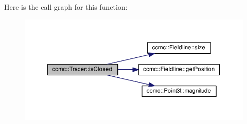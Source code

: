 Here is the call graph for this function\-:
\nopagebreak
\begin{figure}[H]
\begin{center}
\leavevmode
\includegraphics[width=350pt]{classccmc_1_1_tracer_aee62bc5b0bb724545d1fd32ae2af343f_cgraph}
\end{center}
\end{figure}


